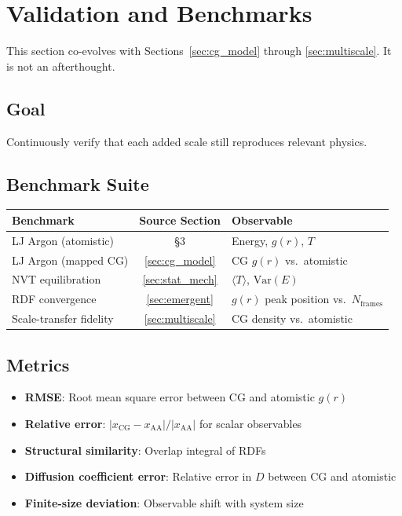 \documentclass[11pt]{article}
\begin{document}
\section{Validation and Benchmarks}
\label{sec:validation}

This section co-evolves with Sections~\ref{sec:cg_model} through
\ref{sec:multiscale}.  It is not an afterthought.

\subsection{Goal}

Continuously verify that each added scale still reproduces relevant physics.

\subsection{Benchmark Suite}

\begin{center}
\begin{tabular}{lcl}
\toprule
\textbf{Benchmark} & \textbf{Source Section} & \textbf{Observable} \\
\midrule
LJ Argon (atomistic) & \S3 & Energy, $g(r)$, $T$ \\
LJ Argon (mapped CG) & \ref{sec:cg_model} & CG $g(r)$ vs.\ atomistic \\
NVT equilibration & \ref{sec:stat_mech} & $\langle T \rangle$, $\text{Var}(E)$ \\
RDF convergence & \ref{sec:emergent} & $g(r)$ peak position vs.\ $N_\text{frames}$ \\
Scale-transfer fidelity & \ref{sec:multiscale} & CG density vs.\ atomistic \\
\bottomrule
\end{tabular}
\end{center}

\subsection{Metrics}

\begin{itemize}
  \item \textbf{RMSE}: Root mean square error between CG and atomistic $g(r)$
  \item \textbf{Relative error}: $|x_\text{CG} - x_\text{AA}| / |x_\text{AA}|$
        for scalar observables
  \item \textbf{Structural similarity}: Overlap integral of RDFs
  \item \textbf{Diffusion coefficient error}: Relative error in $D$ between
        CG and atomistic
  \item \textbf{Finite-size deviation}: Observable shift with system size
\end{itemize}
\end{document}
